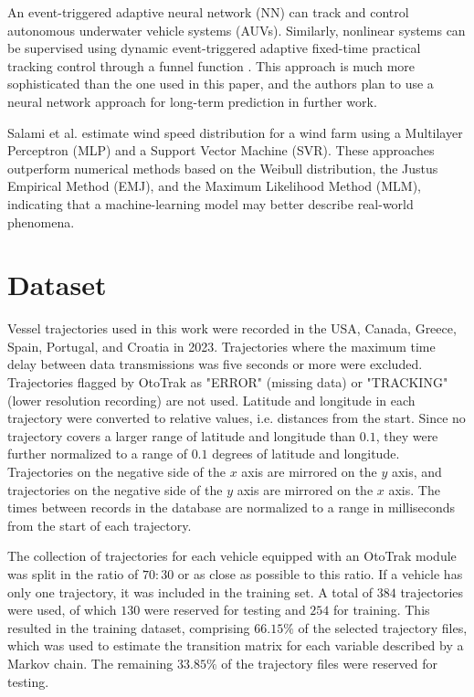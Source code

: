 \documentclass[preprint,12pt]{elsarticle}
\begin{document}
An event-triggered adaptive neural network (NN) \cite{10681283} can track and control autonomous underwater vehicle systems (AUVs). Similarly, nonlinear systems can be supervised using dynamic event-triggered adaptive fixed-time practical tracking control through a funnel function \cite{10681502}. This approach is much more sophisticated than the one used in this paper, and the authors plan to use a neural network approach for long-term prediction in further work.

Salami et al. \citep{salami2022wind} estimate wind speed distribution for a wind farm using a Multilayer Perceptron (MLP) and a Support Vector Machine (SVR). These approaches outperform numerical methods based on the Weibull distribution, the Justus Empirical Method (EMJ), and the Maximum Likelihood Method (MLM), indicating that a machine-learning model may better describe real-world phenomena.

\section{Dataset}
\label{sec:Dataset}

Vessel trajectories used in this work were recorded in the USA, Canada, Greece, Spain, Portugal, and Croatia in 2023. Trajectories where the maximum time delay between data transmissions was five seconds or more were excluded. Trajectories flagged by OtoTrak \cite{ototrakOtoTrakTrack} as "ERROR" (missing data) or "TRACKING" (lower resolution recording) are not used. Latitude and longitude in each trajectory were converted to relative values, i.e. distances from the start. Since no trajectory covers a larger range of latitude and longitude than $0.1$, they were further normalized to a range of $0.1$ degrees of latitude and longitude. Trajectories on the negative side of the $x$ axis are mirrored on the $y$ axis, and trajectories on the negative side of the $y$ axis are mirrored on the $x$ axis. The times between records in the database are normalized to a range in milliseconds from the start of each trajectory.

The collection of trajectories for each vehicle equipped with an OtoTrak module \cite{ototrakOtoTrakTrack} was split in the ratio of $70:30$ or as close as possible to this ratio. If a vehicle has only one trajectory, it was included in the training set. A total of $384$ trajectories were used, of which $130$ were reserved for testing and $254$ for training. This resulted in the training dataset, comprising $66.15\%$ of the selected trajectory files, which was used to estimate the transition matrix for each variable described by a Markov chain. The remaining $33.85\%$ of the trajectory files were reserved for testing.
\end{document}
